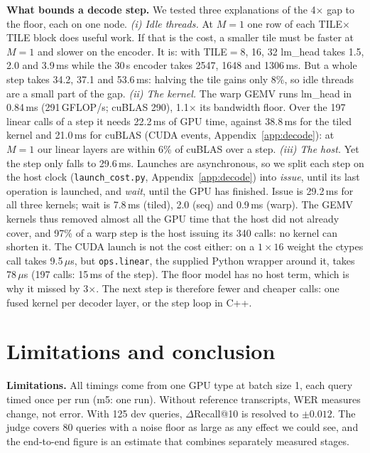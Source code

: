 \documentclass{article}
\begin{document}
\textbf{What bounds a decode step.} We tested three explanations of the 4$\times$ gap
to the floor, each on one node. \emph{(i) Idle threads.} At $M=1$ one row of each
TILE$\times$TILE block does useful work. If that is the cost, a smaller tile must be
faster at $M=1$ and slower on the encoder. It is: with TILE${}=8$, 16, 32 lm\_head takes
1.5, 2.0 and 3.9\,ms while the 30\,s encoder takes 2547, 1648 and 1306\,ms. But a whole
step takes 34.2, 37.1 and 53.6\,ms: halving the tile gains only 8\%, so idle threads
are a small part of the gap. \emph{(ii) The kernel.} The warp GEMV
runs lm\_head in 0.84\,ms (291\,GFLOP/s; cuBLAS 290), 1.1$\times$ its bandwidth floor.
Over the 197 linear calls of a step it needs 22.2\,ms of GPU time, against 38.8\,ms for
the tiled kernel and 21.0\,ms for cuBLAS (CUDA events, Appendix~\ref{app:decode}): at
$M=1$ our linear layers are within 6\% of cuBLAS over a step. \emph{(iii)
The host.} Yet the step only falls to 29.6\,ms. Launches are asynchronous, so we split
each step on the host clock (\texttt{launch\_cost.py}, Appendix~\ref{app:decode}) into
\emph{issue}, until its last operation is launched, and \emph{wait}, until the GPU has
finished. Issue is 29.2\,ms for all three kernels; wait is 7.8\,ms (tiled), 2.0 (seq)
and 0.9\,ms (warp). The GEMV kernels thus removed almost all the GPU time that the host
did not already cover, and 97\% of a warp step is the host issuing its 340 calls: no
kernel can shorten it. The CUDA launch is not the cost either: on a $1\times16$ weight
the ctypes call takes 9.5\,$\mu$s, but \texttt{ops.linear}, the supplied Python wrapper
around it, takes 78\,$\mu$s (197 calls: 15\,ms of the step). The floor model has no
host term, which is why it missed by 3$\times$. The next step is therefore fewer and
cheaper calls: one fused kernel per decoder layer, or the step loop in C++.



\section{Limitations and conclusion}
\label{sec:conclusion}

\textbf{Limitations.} All timings come from one GPU type at batch size 1, each query
timed once per run (m5: one run). Without reference transcripts, WER measures change,
not error. With 125 dev queries, $\Delta$Recall@10 is resolved to $\pm0.012$. The judge
covers 80 queries with a noise floor as large as any effect we could see, and the
end-to-end figure is an estimate that combines separately measured stages.
\end{document}
